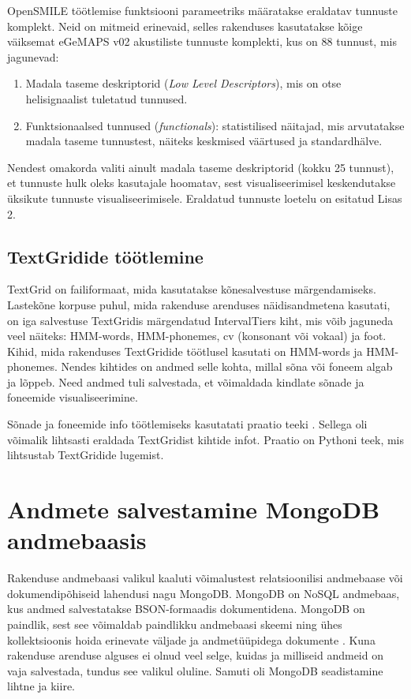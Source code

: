 OpenSMILE töötlemise funktsiooni parameetriks määratakse eraldatav tunnuste komplekt. Neid on mitmeid erinevaid, selles rakenduses kasutatakse kõige väiksemat eGeMAPS v02 akustiliste tunnuste komplekti, kus on 88 tunnust, mis jagunevad:

\begin{enumerate}
    \item Madala taseme deskriptorid (\textit{Low Level Descriptors}), mis on otse helisignaalist tuletatud tunnused.
    \item Funktsionaalsed tunnused (\textit{functionals}): statistilised näitajad, mis arvutatakse madala taseme tunnustest, näiteks keskmised väärtused ja standardhälve.
\end{enumerate}

Nendest omakorda valiti ainult madala taseme deskriptorid (kokku 25 tunnust), et tunnuste hulk oleks kasutajale hoomatav, sest visualiseerimisel keskendutakse üksikute tunnuste visualiseerimisele. Eraldatud tunnuste loetelu on esitatud Lisas 2.

\subsection{TextGridide töötlemine}
TextGrid \cite{textgrid} on failiformaat, mida kasutatakse kõnesalvestuse märgendamiseks. Lastekõne korpuse puhul, mida rakenduse arenduses näidisandmetena kasutati, on iga salvestuse TextGridis märgendatud IntervalTiers kiht, mis võib jaguneda veel näiteks: HMM-words, HMM-phonemes, cv (konsonant või vokaal) ja foot. Kihid, mida rakenduses TextGridide töötlusel kasutati on HMM-words ja HMM-phonemes. Nendes kihtides on andmed selle kohta, millal sõna või foneem algab ja lõppeb. Need andmed tuli salvestada, et võimaldada kindlate sõnade ja foneemide visualiseerimine.

Sõnade ja foneemide info töötlemiseks kasutatati praatio teeki \cite{praatio}. Sellega oli võimalik lihtsasti eraldada TextGridist kihtide infot. Praatio on Pythoni teek, mis lihtsustab TextGridide lugemist. 

\section{Andmete salvestamine MongoDB andmebaasis}
Rakenduse andmebaasi valikul kaaluti võimalustest relatsioonilisi andmebaase või dokumendipõhiseid lahendusi nagu MongoDB. MongoDB \cite{mongodb} on NoSQL andmebaas, kus andmed salvestatakse BSON-formaadis dokumentidena. MongoDB on paindlik, sest see võimaldab paindlikku andmebaasi skeemi ning ühes kollektsioonis hoida erinevate väljade ja andmetüüpidega dokumente \cite{mongodb_data_modeling}. Kuna rakenduse arenduse alguses ei olnud veel selge, kuidas ja milliseid andmeid on vaja salvestada, tundus see valikul oluline. Samuti oli MongoDB seadistamine lihtne ja kiire.
 
